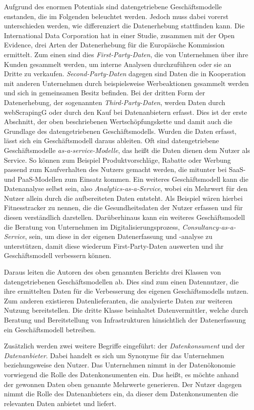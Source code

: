 \noindent Aufgrund des enormen Potentials sind datengetriebene Geschäftsmodelle enstanden, die im Folgenden beleuchtet werden. Jedoch muss dabei vorerst unterschieden werden, wie differenziert die Datenerhebung stattfinden kann. Die International Data Corporation hat in einer Studie, zusammen mit der Open Evidence, drei Arten der Datenerhebung für die Europäische Kommission ermittelt. Zum einen sind dies \textit{First-Party-Daten}, die von Unternehmen über ihre Kunden gesammelt werden, um interne Analysen durchzuführen oder sie an Dritte zu verkaufen. \textit{Second-Party-Daten} dagegen sind Daten die in Kooperation mit anderen Unternehmen durch beispielsweise Werbeaktionen gesammelt werden und sich in gemeinsamen Besitz befinden. Bei der dritten Form der Datenerhebung, der sogenannten \textit{Third-Party-Daten}, werden Daten durch \gls{webScrapingG} oder durch den Kauf bei Datenanbietern erfasst. Dies ist der erste Abschnitt, der oben beschriebenen Wertschöpfungskette und damit auch die Grundlage des datengetriebenen Geschäftsmodells. Wurden die Daten erfasst, lässt sich ein Geschäftsmodell daraus ableiten. Oft sind datengetriebene Geschäftsmodelle \textit{\glqq as-a-service\grqq{}-Modelle}, das heißt die Daten dienen dem Nutzer als Service. So können zum Beispiel Produktvorschläge, Rabatte oder Werbung passend zum Kaufverhalten des Nutzers gemacht werden, die mitunter bei \gls{SaaS}- und \gls{PaaS}-Modellen zum Einsatz kommen. Ein weiteres Geschäftsmodell kann die Datenanalyse selbst sein, also \textit{Analytics-as-a-Service}, wobei ein Mehrwert für den Nutzer allein durch die aufbereiteten Daten entsteht. Als Beispiel wären hierbei Fitnesstracker zu nennen, die die Gesundheitsdaten der Nutzer erfassen und für diesen verständlich darstellen. Darüberhinaus kann ein weiteres Geschäftsmodell die Beratung von Unternehmen im Digitalisierungsprozess, \textit{Consultancy-as-a-Service}, sein, um diese in der eigenen Datenerfassung und -analyse zu unterstützen, damit diese wiederum First-Party-Daten auswerten  und ihr Geschäftsmodell verbessern können. \newline

\noindent Daraus leiten die Autoren des oben genannten Berichts drei Klassen von datengetriebenen Geschäftsmodellen ab. Dies sind zum einen Datennutzer, die ihre ermittelten Daten für die Verbesserung des eigenen Geschäftsmodells nutzen. Zum anderen existieren Datenlieferanten, die analysierte Daten zur weiteren Nutzung bereitstellen. Die dritte Klasse beinhaltet Datenvermittler, welche durch Beratung und Bereitstellung von Infrastrukturen hinsichtlich der Datenerfassung ein Geschäftsmodell betreiben. \cite{smart_2013} \newline

\noindent Zusätzlich werden zwei weitere Begriffe eingeführt: der \textit{Datenkonsument} und der \textit{Datenanbieter}. Dabei handelt es sich um Synonyme für das Unternehmen beziehungsweise den Nutzer. Das Unternehmen nimmt in der Datenökonomie vorwiegend die Rolle des Datenkonsumenten ein. Das heißt, es möchte anhand der gewonnen Daten oben genannte Mehrwerte generieren. Der Nutzer dagegen nimmt die Rolle des Datenanbieters ein, da dieser dem Datenkonsumenten die relevanten Daten anbietet und liefert. 